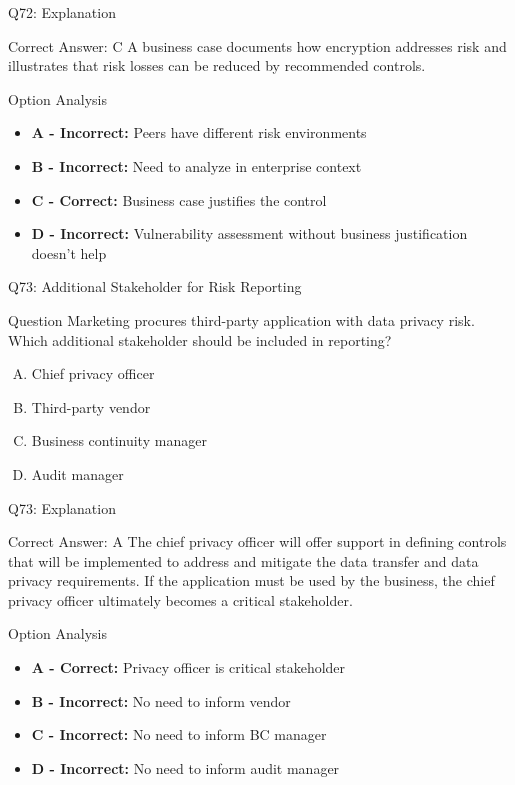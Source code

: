 \documentclass{beamer}
\begin{document}
	\begin{frame}{Q72: Explanation}
		\begin{block}{Correct Answer: C}
			A business case documents how encryption addresses risk and illustrates that risk losses can be reduced by recommended controls.
		\end{block}
		\begin{block}{Option Analysis}
			\begin{itemize}
				\item \textbf{A - Incorrect:} Peers have different risk environments
				\item \textbf{B - Incorrect:} Need to analyze in enterprise context
				\item \textbf{C - Correct:} Business case justifies the control
				\item \textbf{D - Incorrect:} Vulnerability assessment without business justification doesn't help
			\end{itemize}
		\end{block}
	\end{frame}
	
	\begin{frame}{Q73: Additional Stakeholder for Risk Reporting}
		\begin{block}{Question}
			Marketing procures third-party application with data privacy risk. Which additional stakeholder should be included in reporting?
		\end{block}
		\begin{enumerate}[(A)]
			\item Chief privacy officer
			\item Third-party vendor
			\item Business continuity manager
			\item Audit manager
		\end{enumerate}
	\end{frame}
	
	\begin{frame}{Q73: Explanation}
		\begin{block}{Correct Answer: A}
			The chief privacy officer will offer support in defining controls that will be implemented to address and mitigate the data transfer and data privacy requirements. If the application must be used by the business, the chief privacy officer ultimately becomes a critical stakeholder.
		\end{block}
		\begin{block}{Option Analysis}
			\begin{itemize}
				\item \textbf{A - Correct:} Privacy officer is critical stakeholder
				\item \textbf{B - Incorrect:} No need to inform vendor
				\item \textbf{C - Incorrect:} No need to inform BC manager
				\item \textbf{D - Incorrect:} No need to inform audit manager
			\end{itemize}
		\end{block}
	\end{frame}
	
\end{document}
